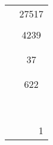 \begin{table}[htbp]
\begin{tabular}{|c|l|}
\multicolumn{ 1}{|c|}{} & \multicolumn{ 1}{c|}{27517} \\ 
\multicolumn{ 1}{|c|}{} & \multicolumn{ 1}{l|}{} \\ \cline{ 2- 2}
\multicolumn{ 1}{|c|}{} & \multicolumn{ 1}{c|}{4239} \\ 
\multicolumn{ 1}{|c|}{} & \multicolumn{ 1}{l|}{} \\ 
\multicolumn{ 1}{|c|}{} & \multicolumn{ 1}{l|}{} \\ \cline{ 2- 2}
\multicolumn{ 1}{|c|}{} & \multicolumn{ 1}{c|}{37} \\ 
\multicolumn{ 1}{|c|}{} & \multicolumn{ 1}{l|}{} \\ 
\multicolumn{ 1}{|c|}{} & \multicolumn{ 1}{l|}{} \\ \cline{ 2- 2}
\multicolumn{ 1}{|c|}{} & \multicolumn{ 1}{c|}{622} \\ 
\multicolumn{ 1}{|c|}{} & \multicolumn{ 1}{l|}{} \\ 
\multicolumn{ 1}{|c|}{} & \multicolumn{ 1}{l|}{} \\ 
\multicolumn{ 1}{|c|}{} & \multicolumn{ 1}{l|}{} \\ 
\multicolumn{ 1}{|c|}{} & \multicolumn{ 1}{l|}{} \\ 
\multicolumn{ 1}{|c|}{} & \multicolumn{ 1}{l|}{} \\ 
\multicolumn{ 1}{|c|}{} & \multicolumn{ 1}{l|}{} \\ 
\multicolumn{ 1}{|c|}{} & \multicolumn{ 1}{l|}{} \\ 
\multicolumn{ 1}{|c|}{} & \multicolumn{ 1}{l|}{} \\ \cline{ 2- 2}
\multicolumn{ 1}{|c|}{} & \multicolumn{1}{r|}{1} \\ \hline
\end{tabular}
\label{}
\end{table}

